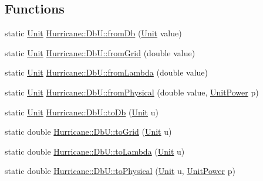 \subsection*{Functions}
\begin{DoxyCompactItemize}
\item 
static \mbox{\hyperlink{group__DbUGroup_ga4fbfa3e8c89347af76c9628ea06c4146}{Unit}} \mbox{\hyperlink{group__DbUGroup_gaec69d65ec1651c2feea24c5931f4580b}{Hurricane\+::\+Db\+U\+::from\+Db}} (\mbox{\hyperlink{group__DbUGroup_ga4fbfa3e8c89347af76c9628ea06c4146}{Unit}} value)
\item 
static \mbox{\hyperlink{group__DbUGroup_ga4fbfa3e8c89347af76c9628ea06c4146}{Unit}} \mbox{\hyperlink{group__DbUGroup_ga367e1d1b5ac1df076745550cba8a83c1}{Hurricane\+::\+Db\+U\+::from\+Grid}} (double value)
\item 
static \mbox{\hyperlink{group__DbUGroup_ga4fbfa3e8c89347af76c9628ea06c4146}{Unit}} \mbox{\hyperlink{group__DbUGroup_ga4b570755b19ea9ff0f2f258a221bd935}{Hurricane\+::\+Db\+U\+::from\+Lambda}} (double value)
\item 
static \mbox{\hyperlink{group__DbUGroup_ga4fbfa3e8c89347af76c9628ea06c4146}{Unit}} \mbox{\hyperlink{group__DbUGroup_ga11d4dbd9134a19bda35cbacde1cb2769}{Hurricane\+::\+Db\+U\+::from\+Physical}} (double value, \mbox{\hyperlink{group__DbUGroup_ga50b5785bf4d75026c4c112caec3040a7}{Unit\+Power}} p)
\item 
static \mbox{\hyperlink{group__DbUGroup_ga4fbfa3e8c89347af76c9628ea06c4146}{Unit}} \mbox{\hyperlink{group__DbUGroup_gaec07c6e7ae2a2a6f54e2a16b32c8bf26}{Hurricane\+::\+Db\+U\+::to\+Db}} (\mbox{\hyperlink{group__DbUGroup_ga4fbfa3e8c89347af76c9628ea06c4146}{Unit}} u)
\item 
static double \mbox{\hyperlink{group__DbUGroup_ga318d673386c9424e07c12efd598c730d}{Hurricane\+::\+Db\+U\+::to\+Grid}} (\mbox{\hyperlink{group__DbUGroup_ga4fbfa3e8c89347af76c9628ea06c4146}{Unit}} u)
\item 
static double \mbox{\hyperlink{group__DbUGroup_ga4923a9a443871282ad7d331be2a2a5d4}{Hurricane\+::\+Db\+U\+::to\+Lambda}} (\mbox{\hyperlink{group__DbUGroup_ga4fbfa3e8c89347af76c9628ea06c4146}{Unit}} u)
\item 
static double \mbox{\hyperlink{group__DbUGroup_gab901e9d5c12e878728178f113def6c45}{Hurricane\+::\+Db\+U\+::to\+Physical}} (\mbox{\hyperlink{group__DbUGroup_ga4fbfa3e8c89347af76c9628ea06c4146}{Unit}} u, \mbox{\hyperlink{group__DbUGroup_ga50b5785bf4d75026c4c112caec3040a7}{Unit\+Power}} p)
\item 

\end{DoxyCompactItemize}
